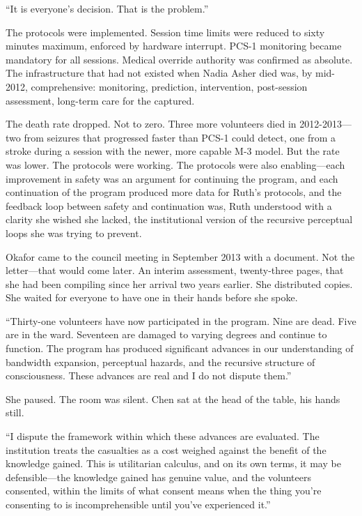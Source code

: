 ``It is everyone's decision. That is the problem.''

The protocols were implemented. Session time limits were reduced to sixty minutes maximum, enforced by hardware interrupt. PCS-1 monitoring became mandatory for all sessions. Medical override authority was confirmed as absolute. The infrastructure that had not existed when Nadia Asher died was, by mid-2012, comprehensive: monitoring, prediction, intervention, post-session assessment, long-term care for the captured.

The death rate dropped. Not to zero. Three more volunteers died in 2012-2013---two from seizures that progressed faster than PCS-1 could detect, one from a stroke during a session with the newer, more capable M-3 model. But the rate was lower. The protocols were working. The protocols were also enabling---each improvement in safety was an argument for continuing the program, and each continuation of the program produced more data for Ruth's protocols, and the feedback loop between safety and continuation was, Ruth understood with a clarity she wished she lacked, the institutional version of the recursive perceptual loops she was trying to prevent.

\scenebreak

Okafor came to the council meeting in September 2013 with a document. Not the letter---that would come later. An interim assessment, twenty-three pages, that she had been compiling since her arrival two years earlier. She distributed copies. She waited for everyone to have one in their hands before she spoke.

``Thirty-one volunteers have now participated in the program. Nine are dead. Five are in the ward. Seventeen are damaged to varying degrees and continue to function. The program has produced significant advances in our understanding of bandwidth expansion, perceptual hazards, and the recursive structure of consciousness. These advances are real and I do not dispute them.''

She paused. The room was silent. Chen sat at the head of the table, his hands still.

``I dispute the framework within which these advances are evaluated. The institution treats the casualties as a cost weighed against the benefit of the knowledge gained. This is utilitarian calculus, and on its own terms, it may be defensible---the knowledge gained has genuine value, and the volunteers consented, within the limits of what consent means when the thing you're consenting to is incomprehensible until you've experienced it.''

